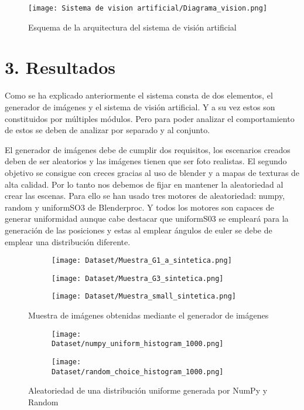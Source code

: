 {\begin{figure}[ht]
	\centering
	\texttt{[image: Sistema de vision artificial/Diagrama\_vision.png]}
	\caption{Esquema de la arquitectura del sistema de visión artificial}
	\label{chap:Resumen fig:Arquitectura sistema}
\end{figure}

\section*{3. Resultados}
Como se ha explicado anteriormente el sistema consta de dos elementos, el generador de imágenes y el sistema de visión artificial. Y a su vez estos son constituidos por múltiples módulos. Pero para poder analizar el comportamiento de estos se deben de analizar por separado y al conjunto.

El generador de imágenes debe de cumplir dos requisitos, los escenarios creados deben de ser aleatorios y las imágenes tienen que ser foto realistas. El segundo objetivo se consigue con creces gracias al uso de blender y a mapas de texturas de alta calidad. Por lo tanto nos debemos de fijar en mantener la aleatoriedad al crear las escenas. Para ello se han usado tres motores de aleatoriedad: numpy, random y uniformSO3 de Blenderproc. Y todos los motores son capaces de generar uniformidad aunque cabe destacar que uniformS03 se empleará para la generación de las posiciones y estas al emplear ángulos de euler se debe de emplear una distribución diferente.

\begin{figure}[ht]
	\ContinuedFloat
	\centering
	\begin{subfigure}[b]{0.3\linewidth}
		\texttt{[image: Dataset/Muestra\_G1\_a\_sintetica.png]}
	\end{subfigure}
	\begin{subfigure}[b]{0.3\linewidth}
		\texttt{[image: Dataset/Muestra\_G3\_sintetica.png]}
	\end{subfigure}
	\begin{subfigure}[b]{0.3\linewidth}
		\texttt{[image: Dataset/Muestra\_small\_sintetica.png]}
	\end{subfigure}
	\caption{Muestra de imágenes obtenidas mediante el generador de imágenes}
	\label{chap:Resumen fig:Muestras BlenderProc}
\end{figure}

\begin{figure}[ht]
	\ContinuedFloat
	\centering
	\begin{subfigure}[b]{0.3\linewidth}
		\texttt{[image: Dataset/numpy\_uniform\_histogram\_1000.png]}
	\end{subfigure}
	\begin{subfigure}[b]{0.3\linewidth}
		\texttt{[image: Dataset/random\_choice\_histogram\_1000.png]}
	\end{subfigure}
	\caption{Aleatoriedad de una distribución uniforme generada por NumPy y Random}
	\label{chap:Resumen fig:numpy and random uniform}
	

\end{figure}}
